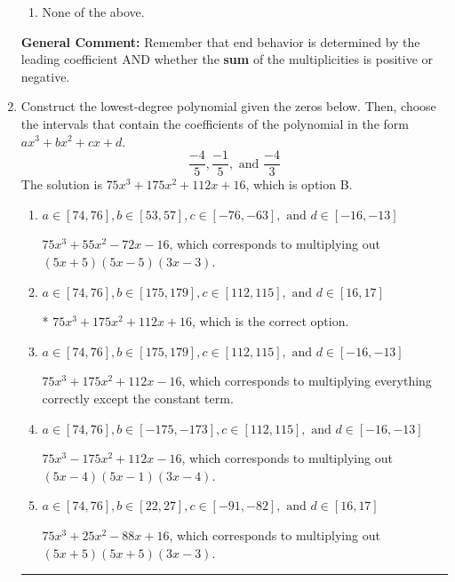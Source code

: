 \documentclass{extbook}[14pt]
\newcommand{\litem}[1]{\item #1

\rule{\textwidth}{0.4pt}}
\begin{document}
\begin{enumerate}
{\begin{enumerate}[label=\Alph*.]
\begin{multicols}{2}
\end{multicols}\item None of the above.\end{enumerate}
\textbf{General Comment:} Remember that end behavior is determined by the leading coefficient AND whether the \textbf{sum} of the multiplicities is positive or negative.
}
\litem{
Construct the lowest-degree polynomial given the zeros below. Then, choose the intervals that contain the coefficients of the polynomial in the form $ax^3+bx^2+cx+d$.
\[ \frac{-4}{5}, \frac{-1}{5}, \text{ and } \frac{-4}{3} \]
The solution is \( 75x^{3} +175 x^{2} +112 x + 16 \), which is option B.\begin{enumerate}[label=\Alph*.]
\item \( a \in [74, 76], b \in [53, 57], c \in [-76, -63], \text{ and } d \in [-16, -13] \)

$75x^{3} +55 x^{2} -72 x -16$, which corresponds to multiplying out $(5x + 5)(5x -5)(3x -3)$.
\item \( a \in [74, 76], b \in [175, 179], c \in [112, 115], \text{ and } d \in [16, 17] \)

* $75x^{3} +175 x^{2} +112 x + 16$, which is the correct option.
\item \( a \in [74, 76], b \in [175, 179], c \in [112, 115], \text{ and } d \in [-16, -13] \)

$75x^{3} +175 x^{2} +112 x -16$, which corresponds to multiplying everything correctly except the constant term.
\item \( a \in [74, 76], b \in [-175, -173], c \in [112, 115], \text{ and } d \in [-16, -13] \)

$75x^{3} -175 x^{2} +112 x -16$, which corresponds to multiplying out $(5x -4)(5x -1)(3x -4)$.
\item \( a \in [74, 76], b \in [22, 27], c \in [-91, -82], \text{ and } d \in [16, 17] \)

$75x^{3} +25 x^{2} -88 x + 16$, which corresponds to multiplying out $(5x + 5)(5x + 5)(3x -3)$.
\end{enumerate}

}
\end{enumerate}
\end{document}
